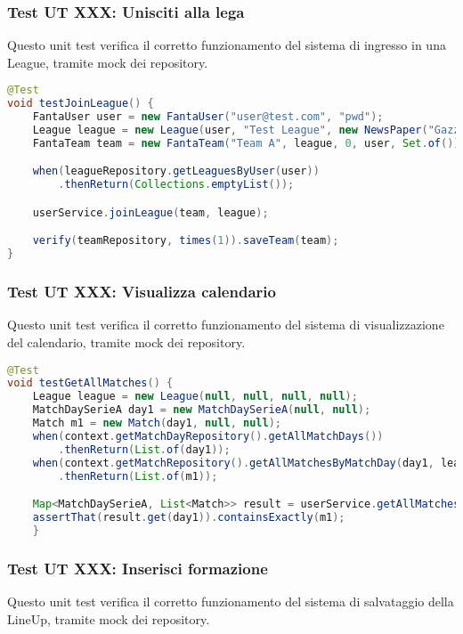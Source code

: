 \subsubsection{Test UT XXX: Unisciti alla lega}

Questo unit test verifica il corretto funzionamento del sistema di ingresso in una League,
tramite mock dei repository.

\begin{lstlisting}[language=Java]
@Test
void testJoinLeague() {
	FantaUser user = new FantaUser("user@test.com", "pwd");
	League league = new League(user, "Test League", new NewsPaper("Gazzetta"), "L002");
	FantaTeam team = new FantaTeam("Team A", league, 0, user, Set.of());

	when(leagueRepository.getLeaguesByUser(user))
        .thenReturn(Collections.emptyList());

	userService.joinLeague(team, league);

	verify(teamRepository, times(1)).saveTeam(team);
}
\end{lstlisting}


\subsubsection{Test UT XXX: Visualizza calendario}

Questo unit test verifica il corretto funzionamento del sistema di visualizzazione del calendario,
tramite mock dei repository.

\begin{lstlisting}[language=Java]
@Test
void testGetAllMatches() {
	League league = new League(null, null, null, null);
	MatchDaySerieA day1 = new MatchDaySerieA(null, null);
	Match m1 = new Match(day1, null, null);
	when(context.getMatchDayRepository().getAllMatchDays())
        .thenReturn(List.of(day1));
	when(context.getMatchRepository().getAllMatchesByMatchDay(day1, league))
        .thenReturn(List.of(m1));

	Map<MatchDaySerieA, List<Match>> result = userService.getAllMatches(league);
	assertThat(result.get(day1)).containsExactly(m1);
	}
\end{lstlisting}


\subsubsection{Test UT XXX: Inserisci formazione}

Questo unit test verifica il corretto funzionamento del sistema di salvataggio della LineUp,
tramite mock dei repository.

